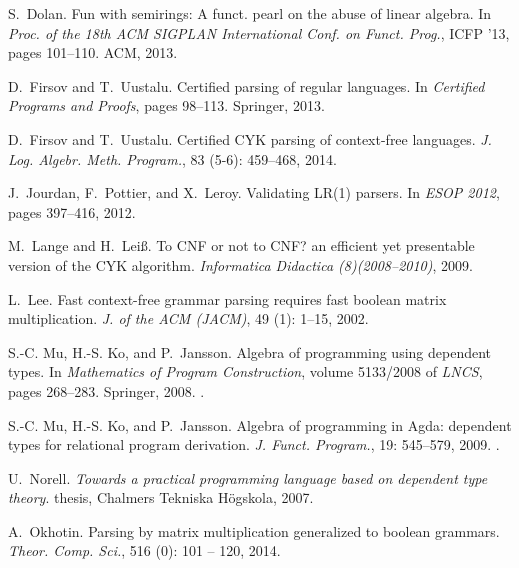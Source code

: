 \documentclass{CSML}
\numberwithin{theorem}{section}
\begin{document}
\begin{thebibliography}{21}
S.~Dolan.
\newblock Fun with semirings: A funct. pearl on the abuse of linear algebra.
\newblock In \emph{Proc. of the 18th {ACM} {SIGPLAN} International Conf. on
  Funct. Prog.}, ICFP '13, pages 101--110. ACM, 2013.

D.~Firsov and T.~Uustalu.
\newblock Certified parsing of regular languages.
\newblock In \emph{Certified Programs and Proofs}, pages 98--113. Springer,
  2013.

D.~Firsov and T.~Uustalu.
\newblock Certified {CYK} parsing of context-free languages.
\newblock \emph{J. Log. Algebr. Meth. Program.}, 83 (5-6):
  459--468, 2014.

J.~Jourdan, F.~Pottier, and X.~Leroy.
\newblock Validating {LR(1)} parsers.
\newblock In \emph{{ESOP} 2012}, pages 397--416, 2012.

M.~Lange and H.~Lei{\ss}.
\newblock To {CNF} or not to {CNF}? an efficient yet presentable version of the
  {CYK} algorithm.
\newblock \emph{Informatica Didactica (8)(2008--2010)}, 2009.

L.~Lee.
\newblock Fast context-free grammar parsing requires fast boolean matrix
  multiplication.
\newblock \emph{J. of the ACM (JACM)}, 49 (1): 1--15, 2002.

S.-C. Mu, H.-S. Ko, and P.~Jansson.
\newblock Algebra of programming using dependent types.
\newblock In \emph{Mathematics of Program Construction}, volume 5133/2008 of
  \emph{LNCS}, pages 268--283. Springer, 2008.
\newblock {}.

S.-C. Mu, H.-S. Ko, and P.~Jansson.
\newblock Algebra of programming in {Agda}: dependent types for relational
  program derivation.
\newblock \emph{J. Funct. Program.}, 19: 545--579, 2009.
\newblock {}.

U.~Norell.
\newblock \emph{Towards a practical programming language based on dependent
  type theory}.
 thesis, Chalmers Tekniska Högskola, 2007.

A.~Okhotin.
\newblock Parsing by matrix multiplication generalized to boolean grammars.
\newblock \emph{Theor. Comp. Sci.}, 516 (0): 101 -- 120,
  2014.


\end{thebibliography}
\end{document}

